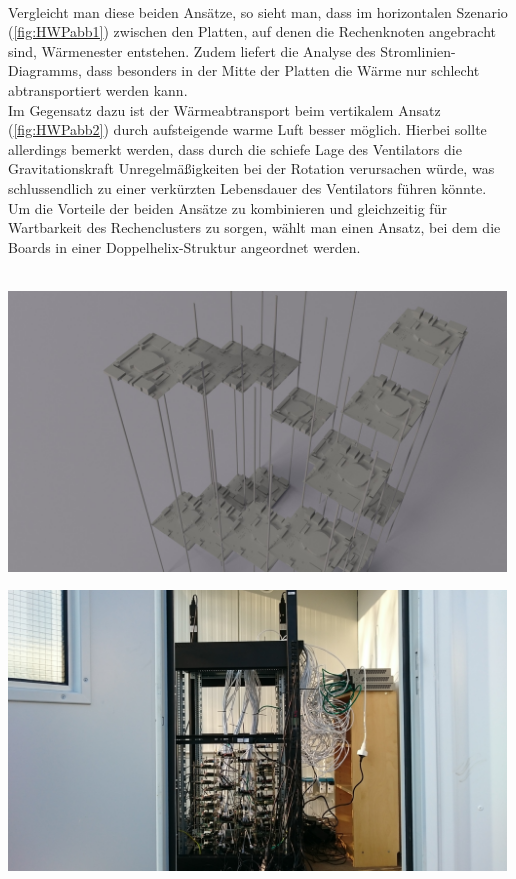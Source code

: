 ~\\
Vergleicht man diese beiden Ansätze, so sieht man, dass im horizontalen Szenario (\ref{fig:HWPabb1}) zwischen den 
Platten, auf denen die Rechenknoten angebracht sind, Wärmenester entstehen. Zudem liefert die
Analyse des Stromlinien-Diagramms, dass besonders in der Mitte der Platten die Wärme nur schlecht  
abtransportiert werden kann.\\
Im Gegensatz dazu ist der Wärmeabtransport beim vertikalem Ansatz (\ref{fig:HWPabb2}) durch aufsteigende warme Luft
besser möglich. Hierbei sollte allerdings bemerkt werden, dass durch die schiefe Lage des Ventilators
die Gravitationskraft Unregelmäßigkeiten bei der Rotation verursachen würde, was schlussendlich zu einer verkürzten Lebensdauer des Ventilators führen könnte.\\
Um die Vorteile der beiden Ansätze zu kombinieren und gleichzeitig für Wartbarkeit des 
Rechenclusters zu sorgen, wählt man einen Ansatz, bei dem die Boards in einer Doppelhelix-Struktur 
angeordnet werden.\\
~\\
\begin{minipage}{0.50\textwidth}
\centering
	\includegraphics[width=0.99\textwidth]{./Bilder/Server-Aufbau/render3.jpg}
	\label{fig:HWPabb3}
\end{minipage}
\hfill
\begin{minipage}{0.50\textwidth}
\centering
	\includegraphics[width=0.99\textwidth]{./Bilder/Server-Aufbau/DSC_0020.JPG}
	\label{fig:HWPabb4}
\end{minipage}
